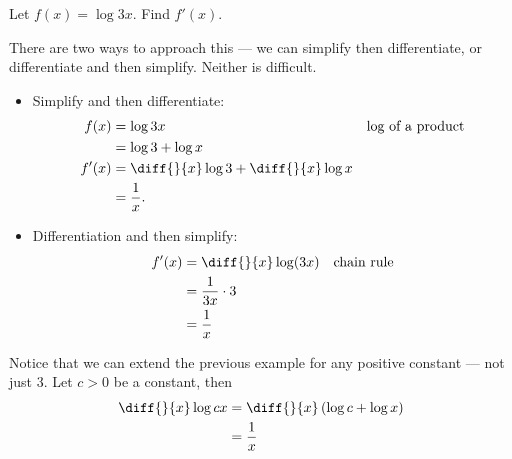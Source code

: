 \begin{eg}\label{eg_2_10_1}
 Let $f(x) = \log 3x$. Find $f'(x)$.

There are two ways to approach this --- we can simplify then differentiate, or
differentiate and then simplify. Neither is difficult.
\begin{itemize}
 \item Simplify and then differentiate:
  \begin{align*}
  f(x) &= \log 3x & \text{log of a product} \\
  &= \log 3 + \log x \\
  f'(x) &= \diff{}{x} \log 3 + \diff{}{x} \log x \\
  &= \frac{1}{x}.
\end{align*}
\item Differentiation and then simplify:
  \begin{align*}
  f'(x) &= \diff{}{x} \log(3x) & \text{chain rule} \\
  &= \frac{1}{3x} \cdot 3 \\
  &= \frac{1}{x}
\end{align*}
\end{itemize}
\end{eg}
\begin{eg}\label{eg_2_10_2}
Notice that we can extend the previous example for any positive constant --- not
just 3. Let $c>0$ be a constant, then
\begin{align*}
  \diff{}{x} \log cx &= \diff{}{x}\left(\log c + \log x \right)\\
  &= \frac{1}{x}
\end{align*}
\end{eg}
